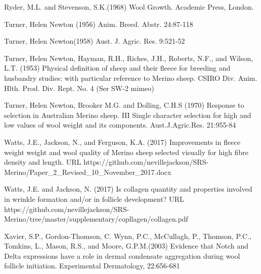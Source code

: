 \documentclass[titlepage]{article}  %
\begin{document}
\begin{thebibliography}{99}
Ryder, M.L. and Stevenson, S.K.(1968) Wool Growth. Academic Press, London.


Turner, Helen Newton (1956) Anim. Breed. Abstr. 24:87-118

Turner, Helen Newton(1958) Aust. J. Agric. Res. 9:521-52

Turner, Helen Newton, Hayman, R.H., Riches, J.H., Roberts, N.F., and Wilson, L.T. (1953) Physical definition of sheep and their fleece for breeding and husbandry studies: with particular reference to Merino sheep. CSIRO Div. Anim. Hlth. Prod. Div. Rept. No. 4 (Ser SW-2 mimeo)

Turner, Helen Newton, Brooker M.G. and Dolling, C.H.S (1970) Response to selection in Australian Merino sheep. III Single character selection for high and low values of wool weight and its components. Aust.J.Agric.Res. 21:955-84

Watts, J.E., Jackson, N., and Ferguson, K.A. (2017) Improvements in fleece weight weight and wool quality of Merino sheep selected visually for high fibre density and length. URL https://github.com/nevillejackson/SRS-Merino/Paper\_2\_Revised\_10\_November\_2017.docx 

Watts, J.E. and Jackson, N. (2017) Is collagen quantity and properties involved in wrinkle formation and/or in follicle development? URL https://github.com/nevillejackson/SRS-Merino/tree/master/supplementary/copllagen/collagen.pdf

Xavier, S.P., Gordon-Thomson, C. Wynn, P.C., McCullagh, P., Thomson, P.C., Tomkins, L., Mason, R.S., and Moore, G.P.M.(2003) Evidence that Notch and Delta expressions have a role in dermal condensate aggregation during wool follicle initiation. Experimental Dermatology, 22:656-681

\end{thebibliography}
\end{document}
